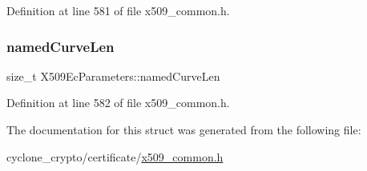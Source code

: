 Definition at line 581 of file x509\+\_\+common.\+h.

\mbox{\label{structX509EcParameters_ac58081bd63ed68d0cb101ff7e65667ec}} 
\subsubsection{\texorpdfstring{named\+Curve\+Len}{namedCurveLen}}
{\footnotesize\ttfamily size\+\_\+t X509\+Ec\+Parameters\+::named\+Curve\+Len}



Definition at line 582 of file x509\+\_\+common.\+h.



The documentation for this struct was generated from the following file\+:\begin{DoxyCompactItemize}
\item 
cyclone\+\_\+crypto/certificate/\hyperlink{certificate_2x509__common_8h}{x509\+\_\+common.\+h}\end{DoxyCompactItemize}
